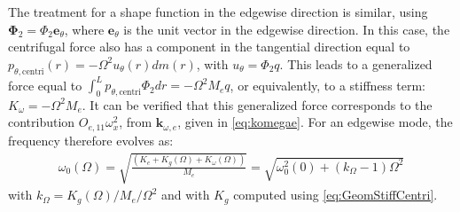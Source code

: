 \documentclass[wes, manuscript]{copernicus}
\renewcommand{\v}[1]{\boldsymbol{#1}}
\begin{document}
The treatment for a shape function in the edgewise direction is similar, using $\v{\Phi}_2=\Phi_2 \v{e}_\theta$, 
where $\v{e}_\theta$ is the unit vector in the edgewise direction.
In this case, the centrifugal force also has a component in the tangential direction equal to $p_{\theta,\text{centri}}(r) = -\Omega^2u_\theta(r) dm(r)$, with $u_\theta=\Phi_2 q$. 
This leads to a generalized force equal to $\int_0^L p_{\theta,\text{centri}} \Phi_2 dr=-\Omega^2 M_{e} q$, or equivalently, to a stiffness term: $K_{\omega}=-\Omega^2 M_{e}$.
It can be verified that this generalized force corresponds to the contribution $O_{e,11}\omega_x^2$, from $\v{k}_{\omega,e}$, given in \autoref{eq:komegae}.
For an edgewise mode, the frequency therefore evolves as: 
\begin{align}
 \omega_0(\Omega)=\sqrt{\frac{(K_{e}+ K_g(\Omega)+K_\omega(\Omega))}{M_e}}=\sqrt{\omega_0^2(0)+(k_\Omega-1)\Omega^2}
\end{align}
 with $k_\Omega=K_g(\Omega)/M_e/\Omega^2$ and with $K_g$ computed using \autoref{eq:GeomStiffCentri}.
\end{document}
